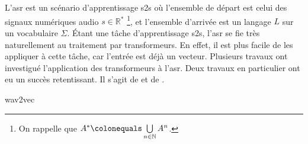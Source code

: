\section{}
\label{sec.asr}

L'\gls{asr} est un scénario d'apprentissage \gls{s2s} où 
l'ensemble de départ est celui des signaux numériques audio \(s\in\mathbb{R}^\ast\)%
\footnote{%
   On rappelle que \(A^\ast \colonequals \bigcup\limits_{n\in\mathbb{N}} A^n\).
}, %
et l'ensemble d'arrivée est un langage \(L\) sur un vocabulaire \(\Sigma\).
Étant une tâche d'apprentissage \gls{s2s}, l'\gls{asr} se fie très naturellement au traitement par transformeurs.
En effet, il est plus facile de les appliquer à cette tâche, car l'entrée est déjà un vecteur.
Plusieurs travaux ont investigué l'application des transformeurs à l'\gls{asr}.
Deux travaux en particulier ont eu un succès retentissant.
Il s'agit de \cite{Schneider_Baevski_Collobert_Auli_2019} 
et de \cite{Radford_Kim_Xu_Brockman_McLeavey_Sutskever_2022}.

{wav2vec}